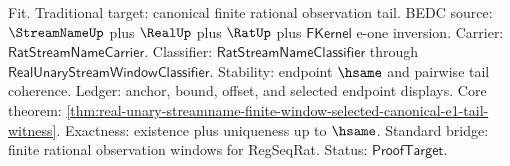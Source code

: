 Fit. Traditional target: canonical finite rational observation tail. BEDC
source: $\StreamNameUp$ plus $\RealUp$ plus $\RatUp$ plus $\mathsf{FKernel}$
e-one inversion. Carrier: $\mathsf{RatStreamNameCarrier}$. Classifier:
$\mathsf{RatStreamNameClassifier}$ through
$\mathsf{RealUnaryStreamWindowClassifier}$. Stability: endpoint $\hsame$ and
pairwise tail coherence. Ledger: anchor, bound, offset, and selected endpoint
displays. Core
theorem:
\autoref{thm:real-unary-streamname-finite-window-selected-canonical-e1-tail-witness}.
Exactness: existence plus uniqueness up to $\hsame$. Standard bridge: finite
rational observation windows for RegSeqRat. Status: $\mathsf{ProofTarget}$.
